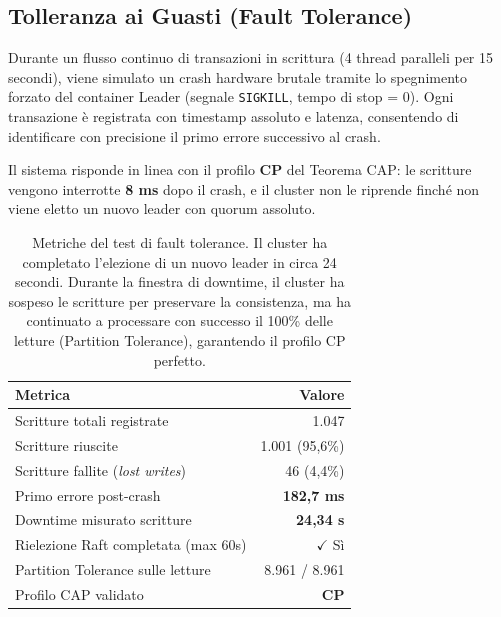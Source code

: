 \subsection{Tolleranza ai Guasti (Fault Tolerance)}
Durante un flusso continuo di transazioni in scrittura (4 thread paralleli per 15 secondi), viene simulato un crash hardware brutale tramite lo spegnimento forzato del container Leader (segnale \texttt{SIGKILL}, tempo di stop = 0). Ogni transazione è registrata con timestamp assoluto e latenza, consentendo di identificare con precisione il primo errore successivo al crash.

Il sistema risponde in linea con il profilo \textbf{CP} del Teorema CAP: le scritture vengono interrotte \textbf{8 ms} dopo il crash, e il cluster non le riprende finché non viene eletto un nuovo leader con quorum assoluto.

\begin{table}[hbt!]
  \centering
  \begin{tabular}{lr}
    \hline
    \textbf{Metrica} & \textbf{Valore} \\
    \hline
    Scritture totali registrate          & 1.047 \\
    Scritture riuscite                   & 1.001 (95,6\%) \\
    Scritture fallite (\textit{lost writes}) & 46 (4,4\%) \\
    Primo errore post-crash              & \textbf{182,7 ms} \\
    Downtime misurato scritture          & \textbf{24,34 s} \\
    Rielezione Raft completata (max 60s) & $\checkmark$ Sì \\
    Partition Tolerance sulle letture    & 8.961 / 8.961 \\
    Profilo CAP validato                 & \textbf{CP} \\
    \hline
  \end{tabular}
  \caption{Metriche del test di fault tolerance. Il cluster ha completato l'elezione di un nuovo leader in circa 24 secondi. Durante la finestra di downtime, il cluster ha sospeso le scritture per preservare la consistenza, ma ha continuato a processare con successo il 100\% delle letture (Partition Tolerance), garantendo il profilo CP perfetto.}
  \label{tab:fault_tolerance}
\end{table}


